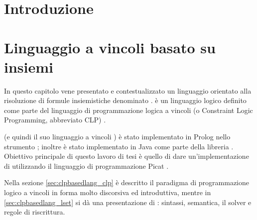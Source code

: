 \documentclass[12pt,a4paper,openright]{book} %
\newenvironment{dedication}                   %
  {%
   \thispagestyle{empty}%
   \vspace*{\stretch{1}}%
   \itshape             %
   \raggedleft          %
  }
  {\par %
   \vspace{\stretch{3}} %
   \clearpage           %
  }
\begin{document}

\tableofcontents
\listoffigures
\listofalgorithms



\chapter*{Introduzione}

\lipsum[1-4]


%
%


\chapter{Linguaggio a vincoli basato su insiemi}
\label{ch:clpbasedlang}

\minitoc

In questo capitolo vene presentato e contestualizzato un linguaggio
orientato alla risoluzione di formule insiemistiche denominato
\lset{}. \lset{} è un linguaggio logico definito come parte del
linguaggio di programmazione logica a vincoli (o Constraint Logic
Programming, abbreviato CLP) \clpset{}.

\clpset{} (e quindi il suo linguaggio a vincoli \lset{}) è stato
implementato in Prolog nello strumento \setlog{} \cite{SetLog};
inoltre \lset{} è stato implementato in Java come parte della libreria
\jsetl{} \cite{JSetL}. Obiettivo principale di questo lavoro di tesi è
quello di dare un’implementazione di \lset{} utilizzando il linguaggio
di programmazione Picat \cite{PicatLang}.

Nella sezione \ref{sec:clpbasedlang_clp} è descritto il paradigma di
programmazione logico a vincoli in forma molto discorsiva ed
introduttiva, mentre in \ref{sec:clpbasedlang_lset} si dà una
presentazione di \lset{}: sintassi, semantica, il solver e regole di
riscrittura.
\end{document}

